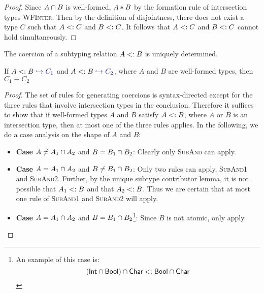 \documentclass[nocopyrightspace,preprint,times,9pt]{sigplanconf}
\begin{document}
\newcommand{\wfinterlabel}{\textsc{WFInter}}

\begin{proof}
Since $A \cap B$ is well-formed, $A * B$ by the formation rule of intersection types \wfinterlabel. Then by the definition of disjointness, there does not exist a type $C$ such that $A <: C$ and $B <: C$. It follows that $A <: C$ and $B <: C$ cannot hold simultaneously.
\end{proof}

The coercion of a subtyping relation $A <: B$ is uniquely determined.

\begin{lemma} \label{unique-coercion}
If $A \subtype B \yields {C_1}$ and $A \subtype B \yields {C_2}$, where $A$ and $B$ are well-formed types, then $C_1 \equiv C_2$
\end{lemma}

\begin{proof}
The set of rules for generating coercions is syntax-directed except for the three rules that involve intersection types in the conclusion. Therefore it suffices to show that if well-formed types $A$ and $B$ satisfy $A <: B$, where $A$ or $B$ is an intersection type, then at most one of the three rules applies. In the following, we do a case analysis on the shape of $A$ and $B$:

\begin{itemize}
  \item \textbf{Case} $A \neq A_1 \cap A_2$ and $B = B_1 \cap B_2$: Clearly only \textsc{SubAnd} can apply.
  \item \textbf{Case} $A = A_1 \cap A_2$ and $B \neq B_1 \cap B_2$: Only two rules can apply, \textsc{SubAnd1} and \textsc{SubAnd2}. Further, by the unique subtype contributor lemma, it is not possible that $A_1 <: B$ and that $A_2 <: B$. Thus we are certain that at most one rule of \textsc{SubAnd1} and \textsc{SubAnd2} will apply.
  \item \textbf{Case} $A = A_1 \cap A_2$ and $B = B_1 \cap B_2$\footnote{An example of this case is:
    \[ (\textsf{Int} \cap \textsf{Bool}) \cap \textsf{Char} <: \textsf{Bool} \cap \textsf{Char} \]}: Since $B$ is not atomic, only  apply.

\end{itemize}
\end{proof}
\end{document}
